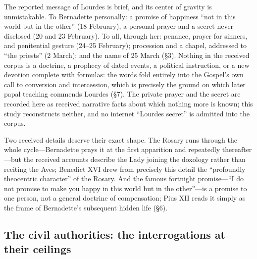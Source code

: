 The reported message of Lourdes is brief, and its center of gravity
is unmistakable. To Bernadette personally: a promise of happiness
``not in this world but in the other'' (18 February), a personal
prayer and a secret never disclosed (20 and 23 February). To all,
through her: penance, prayer for sinners, and penitential gesture
(24--25 February); procession and a chapel, addressed to ``the
priests'' (2 March); and the name of 25 March (\S3). Nothing in
the received corpus is a doctrine, a prophecy of dated events, a
political instruction, or a new devotion complete with formulas:
the words fold entirely into the Gospel's own call to conversion
and intercession, which is precisely the ground on which later
papal teaching commends Lourdes (\S7). The private prayer and the secret are
recorded here as received narrative facts about which nothing more
is known; this study reconstructs neither, and no internet
``Lourdes secret'' is admitted into the corpus.

Two received details deserve their exact shape. The Rosary runs
through the whole cycle---Bernadette prays it at the first
apparition and repeatedly thereafter---but the received accounts
describe the Lady joining the doxology rather than reciting the
Aves; Benedict XVI drew from precisely this detail the
``profoundly theocentric character'' of the Rosary. And the famous fortnight promise---``I
do not promise to make you happy in this world but in the
other''---is a promise to one person, not a general doctrine of
compensation; Pius XII reads it simply as the frame of Bernadette's
subsequent hidden life (\S6).

\subsection{The civil authorities: the interrogations at their
ceilings}

